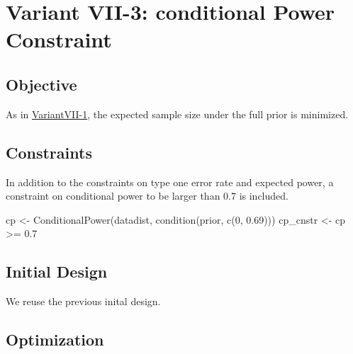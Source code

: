 \documentclass[
]{book}
\newenvironment{Shaded}{\begin{snugshade}}{\end{snugshade}}
\newcommand{\AttributeTok}[1]{\textcolor[rgb]{0.77,0.63,0.00}{#1}}
\newcommand{\DecValTok}[1]{\textcolor[rgb]{0.00,0.00,0.81}{#1}}
\newcommand{\FloatTok}[1]{\textcolor[rgb]{0.00,0.00,0.81}{#1}}
\newcommand{\FunctionTok}[1]{\textcolor[rgb]{0.00,0.00,0.00}{#1}}
\newcommand{\NormalTok}[1]{#1}
\newcommand{\OtherTok}[1]{\textcolor[rgb]{0.56,0.35,0.01}{#1}}
\newcommand{\SpecialCharTok}[1]{\textcolor[rgb]{0.00,0.00,0.00}{#1}}
\begin{document}
\hypertarget{variant-vii-3-conditional-power-constraint}{%
\section{Variant VII-3: conditional Power Constraint}\label{variant-vii-3-conditional-power-constraint}}

\hypertarget{objective-19}{%
\subsection{Objective}\label{objective-19}}

As in \protect\hyperlink{variantVII-1}{VariantVII-1}, the expected sample size under the full prior is minimized.

\hypertarget{constraints-19}{%
\subsection{Constraints}\label{constraints-19}}

In addition to the constraints on type one error rate and expected power, a constraint on conditional power to be larger than \(0.7\) is included.

\begin{Shaded}
\begin{Highlighting}[]
\NormalTok{cp       }\OtherTok{\textless{}{-}} \FunctionTok{ConditionalPower}\NormalTok{(datadist, }\FunctionTok{condition}\NormalTok{(prior, }\FunctionTok{c}\NormalTok{(}\DecValTok{0}\NormalTok{, }\FloatTok{0.69}\NormalTok{)))}
\NormalTok{cp\_cnstr }\OtherTok{\textless{}{-}}\NormalTok{ cp }\SpecialCharTok{\textgreater{}=} \FloatTok{0.7}
\end{Highlighting}
\end{Shaded}

\hypertarget{initial-design-15}{%
\subsection{Initial Design}\label{initial-design-15}}

We reuse the previous inital design.

\hypertarget{optimization-18}{%
\subsection{Optimization}\label{optimization-18}}

\begin{Shaded}
\end{Shaded}
\end{document}
